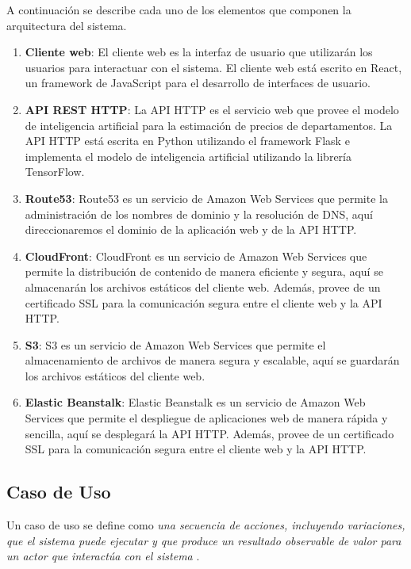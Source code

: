 A continuación se describe cada uno de los elementos que componen la
arquitectura del sistema.

\begin{enumerate}
  \item \textbf{Cliente web}: El cliente web es la interfaz de usuario que
  utilizarán los usuarios para interactuar con el sistema. El cliente web
  está escrito en React, un framework de JavaScript para el desarrollo de
  interfaces de usuario.
  \item \textbf{API REST HTTP}: La API HTTP es el servicio web que provee el
  modelo de inteligencia artificial para la estimación de precios de
  departamentos. La API HTTP está escrita en Python utilizando el framework
  Flask e implementa el modelo de inteligencia artificial utilizando la
  librería TensorFlow.
  \item \textbf{Route53}: Route53 es un servicio de Amazon Web Services que
  permite la administración de los nombres de dominio y la resolución de
  DNS, aquí direccionaremos el dominio de la aplicación web y de la API HTTP.
  \item \textbf{CloudFront}: CloudFront es un servicio de Amazon Web Services
  que permite la distribución de contenido de manera eficiente y segura,
  aquí se almacenarán los archivos estáticos del cliente web. Además, provee
  de un certificado SSL para la comunicación segura entre el cliente web y
  la API HTTP.
  \item \textbf{S3}: S3 es un servicio de Amazon Web Services que permite el
  almacenamiento de archivos de manera segura y escalable, aquí se guardarán
  los archivos estáticos del cliente web.
  \item \textbf{Elastic Beanstalk}: Elastic Beanstalk es un servicio de Amazon
  Web Services que permite el despliegue de aplicaciones web de manera
  rápida y sencilla, aquí se desplegará la API HTTP. Además, provee de un
  certificado SSL para la comunicación segura entre el cliente web y la API
  HTTP.
\end{enumerate}

\subsection{Caso de Uso}

Un caso de uso se define como \textit{una secuencia de acciones, incluyendo variaciones,
que el sistema puede ejecutar y que produce un resultado observable de valor
para un actor que interactúa con el sistema} \cite{jacobson2021unified}.

